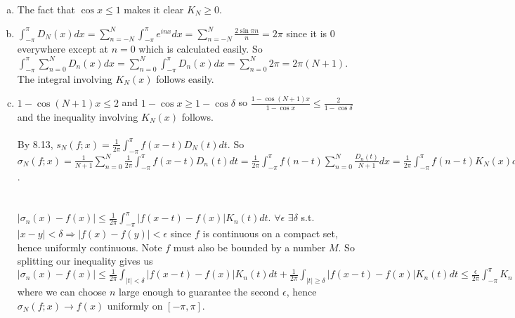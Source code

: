 \documentclass{article}
\begin{document}
\begin{enumerate}
\begin{enumerate}[(a)]
\item The fact that $\cos x \leq 1$ makes it clear $K_N \geq 0$. \\
\item $\displaystyle\int_{-\pi}^{\pi} D_N (x) dx = \sum_{n=-N}^{N} \int_{-\pi}^{\pi} e^{inx} dx =\sum_{n=-N}^{N} \frac{2\sin\pi n}{n} = 2\pi$ since it is $0$ everywhere except at $n=0$ which is calculated easily. So $\displaystyle \int_{-\pi}^{\pi} \sum_{n=0}^{N} D_n (x) dx =  \sum_{n=0}^{N} \int_{-\pi}^{\pi} D_n (x) dx = \sum_{n=0}^{N} 2\pi = 2\pi (N+1)$. The integral involving $K_N (x)$ follows easily.\\
\item $1-\cos(N+1)x \leq 2$ and $1-\cos x \geq 1 - \cos \delta $ so $\displaystyle \frac{1-\cos(N+1)x}{1- \cos x} \leq \frac{2}{1-\cos \delta}$ and the inequality involving $K_N (x)$ follows.\\ \\
By 8.13, $s_N(f;x) = \displaystyle\frac{1}{2\pi}\int_{-\pi}^{\pi} f(x-t) D_N(t) dt$. So $\displaystyle \sigma_N (f;x) =\frac{1}{N+1} \sum_{n=0}^{N} \frac{1}{2\pi}\int_{-\pi}^{\pi} f(x-t) D_n(t) dt=\frac{1}{2\pi}\int_{-\pi}^{\pi}f(n-t) \sum_{n=0}^{N} \frac{D_n (t)}{N+1} dx = \frac{1}{2\pi}\int_{-\pi}^{\pi}f(n-t) K_N (x) dx$.\\ \\ \\
$|\sigma_n (x) - f(x) | \leq \frac{1}{2\pi} \int_{-\pi}^{\pi} |f(x-t) -f(x)|K_n(t) dt$. $\forall \epsilon$ $\exists \delta$ s.t. $|x-y| < \delta \Rightarrow |f(x)-f(y)| < \epsilon$ since $f$ is continuous on a compact set, hence uniformly continuous. Note $f$ must also be bounded by a number $M$. So splitting our inequality gives us $|\sigma_n (x) - f(x) | \leq \displaystyle\frac{1}{2\pi} \int_{|t|<\delta} |f(x-t)-f(x)| K_n (t) dt + \frac{1}{2\pi} \int_{|t|\geq\delta} |f(x-t)-f(x)| K_n (t) dt \leq \frac{\epsilon}{2\pi}\int_{-\pi}^{\pi} K_n(t)+ \frac{1}{2\pi} \int_{|t|\geq\delta} 2M \cdot\frac{1}{N+1}\cdot \frac{2}{1-\cos \delta} dt <  \epsilon + 2M\cdot\frac{1}{n+1}\cdot\frac{2}{1-\cos \delta} < \epsilon + \epsilon = 2\epsilon$ where we can choose $n$ large enough to guarantee the second $\epsilon$, hence $\sigma_N (f; x) \rightarrow f(x)$ uniformly on $[-\pi, \pi]$.  
\end{enumerate}
\end{enumerate}
\end{document}
